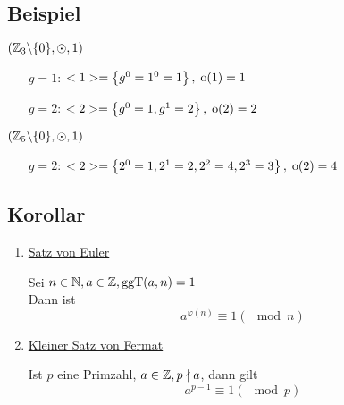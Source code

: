 \subsection{Beispiel}

$(\mathbb{Z}_3 \backslash \{0\}, \odot, 1)$

\begin{itemize}

	\item[$g=1$:]
	$<1> = \left\{g^0 = 1^0 = 1\right\},\; \mathrm{o}(1) = 1$
	
	\item[$g=2$:]
	$<2> = \left\{g^0 = 1, g^1 = 2\right\},\; \mathrm{o}(2)=2$

\end{itemize}

$(\mathbb{Z}_5 \backslash \{0\}, \odot, 1)$

\begin{itemize}
	\item[$g=2$:]
	$<2> = \left\{2^0 = 1, 2^1 = 2, 2^2 = 4, 2^3 = 3\right\}, \; \mathrm{o}(2)=4$
\end{itemize}

\subsection{Korollar}

{\renewcommand{\labelenumi}{(\roman{enumi})}
\begin{enumerate}
	\item
	\underline{Satz von Euler}
	
	Sei $n\in \mathbb{N}, a \in \mathbb{Z}, \mathrm{ ggT }(a, n) = 1$	
	\\Dann ist \[a^{\varphi(n)} \equiv 1 (\mod n)\]
	
	\item
	\underline{Kleiner Satz von Fermat}
	
	Ist $p$ eine Primzahl, $a \in \mathbb{Z}, p \nmid a$, dann gilt
	\[a^{p-1} \equiv 1 (\mod p)\]
	
\end{enumerate}}









